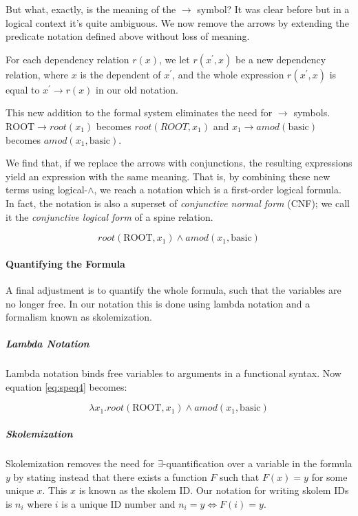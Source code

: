 \documentclass[twoside]{article}
\begin{document}
But what, exactly, is the meaning of the $\rightarrow$ symbol?  It was clear before but in a logical context it's quite ambiguous.  We now remove the arrows by extending the predicate notation defined above without loss of meaning.

For each dependency relation $r(x)$, we let $r(x^\prime, x)$ be a new dependency relation, where $x$ is the dependent of $x^\prime$, and the whole expression $r(x^\prime, x)$ is equal to $x^\prime \rightarrow r(x)$ in our old notation.

This new addition to the formal system eliminates the need for $\rightarrow$ symbols.  $\text{ROOT}\rightarrow root(x_1)$ becomes $root(ROOT, x_1)$ and $x_1 \rightarrow amod ( \text{basic} )$ becomes $amod(x_1, \text{basic})$.

We find that, if we replace the arrows with conjunctions, the resulting expressions yield an expression with the same meaning.  That is, by combining these new terms using logical-$\wedge$, we reach a notation which is a first-order logical formula.  In fact, the notation is also a superset of \textit{conjunctive normal form} (CNF); we call it the \textit{conjunctive logical form} of a spine relation.

\begin{equation} \label{eq:speq4}
root(\text{ROOT}, x_1) \wedge amod ( x_1, \text{basic} )
\end{equation}

\paragraph{Quantifying the Formula}

A final adjustment is to quantify the whole formula, such that the variables are no longer free.  In our notation this is done using lambda notation and a formalism known as skolemization.

\subparagraph{Lambda Notation}

Lambda notation binds free variables to arguments in a functional syntax.  Now equation \ref{eq:speq4} becomes:

\begin{equation} \label{eq:speq5}
\lambda x_1. root(\text{ROOT}, x_1) \wedge amod ( x_1, \text{basic} )
\end{equation}

\subparagraph{Skolemization}

Skolemization removes the need for $\exists$-quantification over a variable in the formula $y$ by stating instead that there exists a function $F$ such that $F(x)=y$ for some unique $x$.  This $x$ is known as the skolem ID. Our notation for writing skolem IDs is $n_i$ where $i$ is a unique ID number and $n_i=y \iff F(i)=y$.
\end{document}
